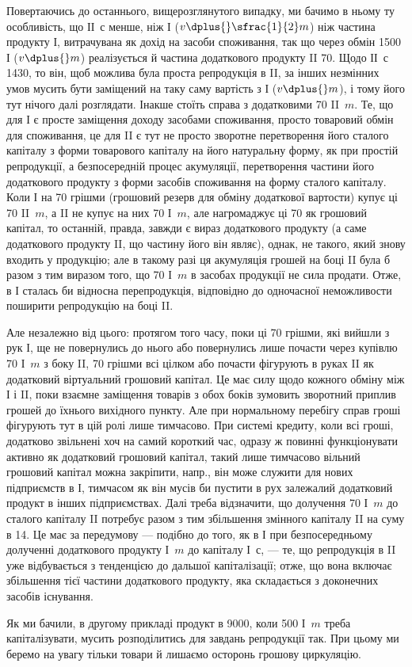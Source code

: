 
Повертаючись до останнього, вищерозглянутого випадку, ми бачимо
в ньому ту особливість, що ІІ~$с$ менше, ніж І ($v \dplus{} \sfrac{1}{2} m$) ніж частина
продукту І, витрачувана як дохід на засоби споживання, так що через
обмін 1500 І ($v \dplus{} m$) реалізується й частина додаткового продукту II \deq{} 70.
Щодо ІІ~$с$ \deq{} 1430, то він, щоб можлива була проста репродукція в II,
за інших незмінних умов мусить бути заміщений на таку саму вартість
з І ($v \dplus{} m$), і тому його тут нічого далі розглядати. Інакше стоїть
справа з додатковими 70 II~$m$. Те, що для І є просте заміщення доходу
засобами споживання, просто товаровий обмін для споживання, це для II
є тут не просто зворотне перетворення його сталого капіталу з форми
товарового капіталу на його натуральну форму, як при простій репродукції,
а безпосередній процес акумуляції, перетворення частини його
додаткового продукту з форми засобів споживання на форму сталого
капіталу. Коли І на 70 грішми (грошовий резерв для обміну
додаткової вартости) купує ці 70 II~$m$, а II не купує на них 70 І~$m$, але
нагромаджує ці 70 як грошовий капітал, то останній, правда,
завжди є вираз додаткового продукту (а саме додаткового продукту II,
що частину його він являє), однак, не такого, який знову входить у
продукцію; але в такому разі ця акумуляція грошей на боці II була б
разом з тим виразом того, що 70 І~$m$ в засобах продукції не сила продати.
Отже, в І сталась би відносна перепродукція, відповідно до одночасної
неможливости поширити репродукцію на боці II.

Але незалежно від цього: протягом того часу, поки ці 70 грішми,
які вийшли з рук І, ще не повернулись до нього або повернулись лише
почасти через купівлю 70 І~$m$ з боку II, 70 грішми всі цілком або почасти
фігурують в руках II як додатковий віртуальний грошовий капітал.
Це має силу щодо кожного обміну між І і II, поки взаємне заміщення
товарів з обох боків зумовить зворотний приплив грошей до їхнього
вихідного пункту. Але при нормальному перебігу справ гроші
фігурують тут в цій ролі лише тимчасово. При системі кредиту, коли
всі гроші, додатково звільнені хоч на самий короткий час, одразу ж повинні
функціонувати активно як додатковий грошовий капітал, такий лише
тимчасово вільний грошовий капітал можна закріпити, напр., він може
служити для нових підприємств в І, тимчасом як він мусів би пустити в
рух залежалий додатковий продукт в інших підприємствах. Далі треба
відзначити, що долучення 70 І~$m$ до сталого капіталу II потребує разом
з тим збільшення змінного капіталу II на суму в 14. Це має за передумову
— подібно до того, як в І при безпосередньому долученні додаткового
продукту І~$m$ до капіталу І~$с$, — те, що репродукція в II уже відбувається
з тенденцією до дальшої капіталізації; отже, що вона включає збільшення
тієї частини додаткового продукту, яка складається з доконечних засобів
існування.

Як ми бачили, в другому прикладі продукт в 9000, коли 500 І~$m$
треба капіталізувати, мусить розподілитись для завдань репродукції так.
При цьому ми беремо на увагу тільки товари й лишаємо осторонь грошову
циркуляцію.
